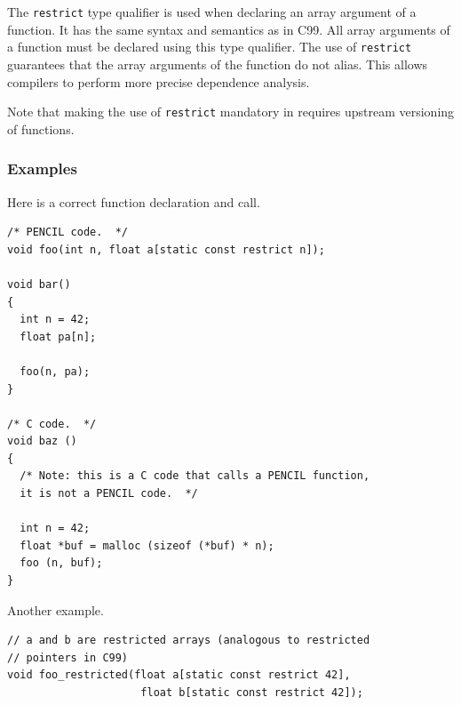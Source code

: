 The \lstinline!restrict! type qualifier is used when declaring an array argument of a \pencil function.
  It has the same syntax and semantics
  as in C99.
  All array arguments of a \pencil function
  must be declared using this type qualifier.
  The use of \lstinline!restrict! guarantees that the array
  arguments of the function do not alias.
  This allows \pencil compilers to
  perform more precise dependence analysis.
  
  Note that making the use of \lstinline!restrict! mandatory in \pencil requires
  upstream versioning of functions.

\subsubsection*{Examples}

Here is a correct \pencil function declaration and call.

\begin{lstlisting}[language=pencil]
/* PENCIL code.  */
void foo(int n, float a[static const restrict n]);

void bar()
{
  int n = 42;
  float pa[n];

  foo(n, pa);
}

/* C code.  */
void baz ()
{
  /* Note: this is a C code that calls a PENCIL function,
  it is not a PENCIL code.  */

  int n = 42;
  float *buf = malloc (sizeof (*buf) * n);
  foo (n, buf);
}
\end{lstlisting}

Another example.

  \begin{lstlisting}[language=pencil]
// a and b are restricted arrays (analogous to restricted
// pointers in C99)
void foo_restricted(float a[static const restrict 42],
                     float b[static const restrict 42]);
  \end{lstlisting}




